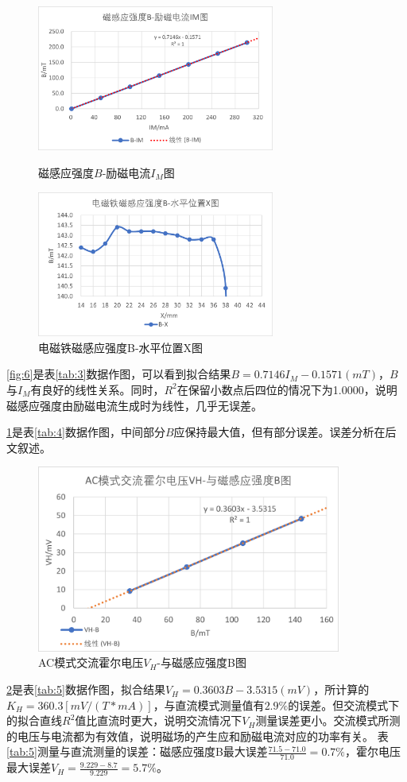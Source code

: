 \documentclass[11pt]{article}
\begin{document}
\begin{figure}[H]
    \centering
    \begin{minipage}[t]{0.49\linewidth}
        \centering
        \includegraphics[width=7.8cm]{Fig/6.png}
        \caption{磁感应强度$B$-励磁电流$I_M$图}
        \label{fig:6}
    \end{minipage}
    \begin{minipage}[t]{0.49\linewidth}
        \centering
        \includegraphics[width=7.8cm]{Fig/7.png}
        \caption{电磁铁磁感应强度B-水平位置X图}
        \label{fig:7}
    \end{minipage}
\end{figure}    
\par \cref{fig:6}是表\ref{tab:3}数据作图，可以看到拟合结果$B=0.7146I_M-0.1571(mT)$，$B$与$I_M$有良好的线性关系。同时，$R^2$在保留小数点后四位的情况下为1.0000，说明磁感应强度由励磁电流生成时为线性，几乎无误差。
\par \cref{fig:7}是表\ref{tab:4}数据作图，中间部分$B$应保持最大值，但有部分误差。误差分析在后文叙述。
\begin{figure}[H]
    \centering
    \includegraphics[width=10cm]{Fig/8.png}
    \caption{AC模式交流霍尔电压$V_H$-与磁感应强度B图}
    \label{fig:8}
\end{figure}
\par \cref{fig:8}是表\ref{tab:5}数据作图，拟合结果$V_H=0.3603B-3.5315(mV)$，所计算的$K_H=360.3\left[mV/(T*mA)\right]$，与直流模式测量值有$2.9\%$的误差。但交流模式下的拟合直线$R^2$值比直流时更大，说明交流情况下$V_H$测量误差更小。交流模式所测的电压与电流都为有效值，说明磁场的产生应和励磁电流对应的功率有关。
表\ref{tab:5}测量与直流测量的误差：磁感应强度B最大误差$\frac{71.5-71.0}{71.0}=0.7\%$，霍尔电压最大误差$V_H=\frac{9.229-8.7}{9.229}=5.7\%$。
\end{document}
